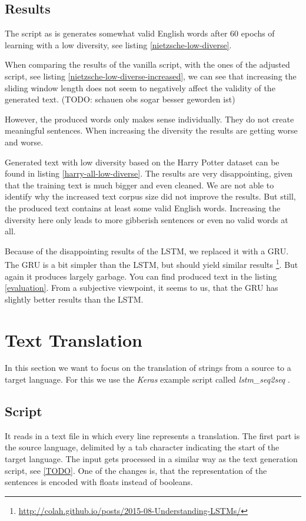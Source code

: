 \documentclass{article}[]
\begin{document}
\subsection{Results}
The script as is generates somewhat valid English words after 60 epochs of learning with a low diversity, see listing \ref{nietzsche-low-diverse}.

When comparing the results of the vanilla script,  with the ones of the adjusted script, see listing \ref{nietzsche-low-diverse-increased}, we can see that increasing the sliding window length does not seem to negatively affect the validity of the generated text. (TODO: schauen obs sogar besser geworden ist)

However, the produced words only makes sense individually.
They do not create meaningful sentences.
When increasing the diversity the results are getting worse and worse.

Generated text with low diversity based on the Harry Potter dataset can be found in listing \ref{harry-all-low-diverse}.
The results are very disappointing, given that the training text is much bigger and even cleaned.
We are not able to identify why the increased text corpus size did not improve the results.
But still, the produced text contains at least some valid English words.
Increasing the diversity here only leads to more gibberish sentences or even no valid words at all.

Because of the disappointing results of the LSTM, we replaced it with a GRU.
The GRU is a bit simpler than the LSTM, but should yield similar results \footnote{\url{http://colah.github.io/posts/2015-08-Understanding-LSTMs/}}.
But again it produces largely garbage.
You can find produced text in the listing \ref{evaluation}.
From a subjective viewpoint, it seems to us, that  the GRU has slightly better results than the LSTM.

\section{Text Translation}
\label{sec:trans}
In this section we want to focus on the translation of strings from a source to a target language.
For this we use the \emph{Keras} example script called \emph{lstm\_seq2seq} \cite{kerasexamples}.

\subsection{Script}
It reads in a text file in which every line represents a translation.
The first part is the source language, delimited by a tab character indicating the start of the target language.
The input gets processed in a similar way as the text generation script, see \ref{TODO}.
One of the changes is, that the representation of the sentences is encoded with floats instead of booleans.
\end{document}
